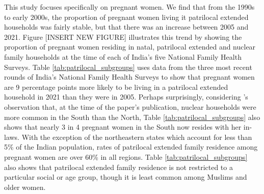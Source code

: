 \documentclass[12pt]{article}
\begin{document}
This study focuses specifically on pregnant women. We find that from the 1990s to early 2000s, the proportion of pregnant women living it patrilocal extended households was fairly stable, but that there was an increase between 2005 and 2021.  Figure [INSERT NEW FIGURE] illustrates this trend by showing the proportion of pregnant women residing in natal, patrilocal extended and nuclear family households at the time of each of India's five National Family Health Surveys.  Table \ref{tab:patrilocal_subgroups} uses data from the three most recent rounds of India's National Family Health Surveys to show that pregnant women are 9 percentage points more likely to be living in a patrilocal extended household in 2021 than they were in 2005.  Perhaps surprisingly, considering \cite{dyson1983kinship}'s observation that, at the time of the paper's publication, nuclear households were more common in the South than the North, Table \ref{tab:patrilocal_subgroups} also shows that nearly 3 in 4 pregnant women in the South now resides with her in-laws.  With the exception of the northeastern states which account for less than 5\% of the Indian population, rates of patrilocal extended family residence among pregnant women are over 60\% in all regions.  Table \ref{tab:patrilocal_subgroups} also shows that patrilocal extended family residence is not restricted to a particular social or age group, though it is least common among Muslims and older women.




\end{document}
